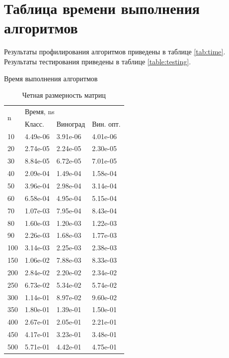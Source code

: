 \section{Таблица времени выполнения алгоритмов}
Результаты профилирования алгоритмов приведены в таблице \ref{tab:time}. Результаты тестирования приведены в таблице \ref{table:testing}.
\begin{table}[ht!]
	\captionsetup{singlelinecheck = false, justification=raggedleft}
	\caption{Время выполнения алгоритмов}
	\renewcommand{\arraystretch}{1.4}
	\begin{subtable}[ht!]{0.45\textwidth}
		\centering
		\caption{Четная размерность матриц}
		\begin{tabular}{||l|l|l|l||}
			\hline
			\multirow{2}{*}{n} & \multicolumn{3}{l||}{Время, ns} \\ \cline{2-4} 
			&  Класс. & Виноград & Вин. опт. \\ \hline\hline
			10 & 4.49e-06 & 3.91e-06 & 4.01e-06 \\ \hline 
			20 & 2.74e-05 & 2.24e-05 & 2.30e-05 \\ \hline 
			30 & 8.84e-05 & 6.72e-05 & 7.01e-05 \\ \hline 
			40 & 2.09e-04 & 1.49e-04 & 1.58e-04 \\ \hline 
			50 & 3.96e-04 & 2.98e-04 & 3.14e-04 \\ \hline 
			60 & 6.58e-04 & 4.95e-04 & 5.15e-04 \\ \hline 
			70 & 1.07e-03 & 7.95e-04 & 8.43e-04 \\ \hline 
			80 & 1.60e-03 & 1.20e-03 & 1.22e-03 \\ \hline 
			90 & 2.26e-03 & 1.68e-03 & 1.77e-03 \\ \hline 
			100 & 3.14e-03 & 2.25e-03 & 2.38e-03 \\ \hline 
			150 & 1.06e-02 & 7.88e-03 & 8.33e-03 \\ \hline 
			200 & 2.84e-02 & 2.20e-02 & 2.34e-02 \\ \hline 
			250 & 6.73e-02 & 5.34e-02 & 5.74e-02 \\ \hline 
			300 & 1.14e-01 & 8.97e-02 & 9.60e-02 \\ \hline 
			350 & 1.80e-01 & 1.39e-01 & 1.50e-01 \\ \hline 
			400 & 2.67e-01 & 2.05e-01 & 2.21e-01 \\ \hline 
			450 & 4.17e-01 & 3.23e-01 & 3.48e-01 \\ \hline 
			500 & 5.71e-01 & 4.42e-01 & 4.75e-01 \\ \hline 
		\end{tabular}

\end{subtable}
\end{table}
